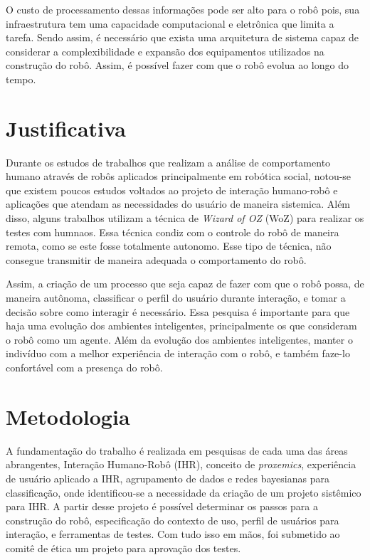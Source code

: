 O custo de processamento dessas informações pode ser alto para o robô pois, sua infraestrutura tem uma capacidade computacional e eletrônica que limita a tarefa. Sendo assim, é necessário que exista uma arquitetura de sistema capaz de considerar a complexibilidade e expansão dos equipamentos utilizados na construção do robô. Assim, é possível fazer com que o robô evolua ao longo do tempo.

\section{Justificativa}
Durante os estudos de trabalhos que realizam a análise de comportamento humano através de robôs aplicados principalmente em robótica social, notou-se que existem poucos estudos voltados ao projeto de interação humano-robô e aplicações que atendam as necessidades do usuário de maneira sistemica. Além disso, alguns trabalhos utilizam a técnica de \emph{Wizard of OZ} (WoZ) para realizar os testes com humnaos. Essa técnica condiz com o controle do robô de maneira remota, como se este fosse totalmente autonomo. Esse tipo de técnica, não consegue transmitir de maneira adequada o comportamento do robô.

Assim, a criação de um processo que seja capaz de fazer com que o robô possa, de maneira autônoma, classificar o perfil do usuário durante interação, e tomar a decisão sobre como interagir é necessário. Essa pesquisa é importante para que haja uma evolução dos ambientes inteligentes, principalmente os que consideram o robô como um agente. Além da evolução dos ambientes inteligentes, manter o indivíduo com a melhor experiência de interação com o robô, e também faze-lo confortável com a presença do robô.

\section{Metodologia}
A fundamentação do trabalho é realizada em pesquisas de cada uma das áreas abrangentes, Interação Humano-Robô (IHR), conceito de \emph{proxemics}, experiência de usuário aplicado a IHR, agrupamento de dados e redes bayesianas para classificação, onde identificou-se a necessidade da criação de um projeto sistêmico para IHR. A partir desse projeto é possível determinar os passos para a construção do robô, especificação do contexto de uso, perfil de usuários para interação, e ferramentas de testes. Com tudo isso em mãos, foi submetido ao comitê de ética um projeto para aprovação dos testes.

